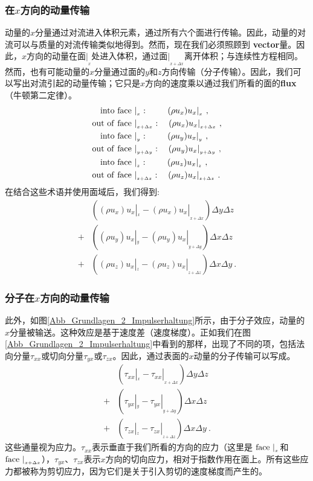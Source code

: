 \documentclass[MathematicsNumericsDerivationsAndOpenFOAM.tex]{subfiles}
\begin{document}
\subsubsection{在$x$方向的动量传输}
%
%
%
 动量的$x$分量通过对流进入体积元素，通过所有六个面进行传输。因此，动量的对流可以与质量的对流传输类似地得到。然而，现在我们必须照顾到 \textbf{vector}量。因此，$x$方向的动量在面$|_{_x}$处进入体积，通过面$|_{_{x+\Delta x}}$离开体积；与连续性方程相同。然而，也有可能动量的$x$分量通过面的$y$和$z$方向传输（分子传输）。因此，我们可以写出对流引起的动量传输；它只是$x$方向的速度乘以通过我们所看的面的\textbf{flux}（牛顿第二定律）。
%
%
\begin{align*}
 \mathrm{into~face~}&|_{_x}: ~~~~~~~
 (\rho u_x)u_x|_{_x} ~, \\
 \mathrm{out~of~face~}&|_{_{x+\Delta x}}: ~~~
 (\rho u_x)u_x |_{_{x+\Delta x}} ~,
 \\
 \mathrm{into~face~}&|_{_y} : ~~~~~~~
 (\rho u_y)u_x |_{_y} ~, \\
 \mathrm{out~of~face~}&|_{_{y+\Delta y}} : ~~~
 (\rho u_y)u_x |_{_{y+\Delta y}} ~,
 \\
 \mathrm{into~face~}&|_{_z} : ~~~~~~~
 (\rho u_z)u_x |_{_z} ~, \\
 \mathrm{out~of~face~}&|_{_{z+\Delta z}} : ~~~
 (\rho u_z)u_x |_{_{z+\Delta z}} ~.
\end{align*}
%
%
	在结合这些术语并使用面域后，我们得到:
%
%
\begin{align*}
  &\left(
    (\rho u_x)u_x |_{_x} - (\rho u_x)u_x |_{_{x+\Delta x}}
  \right)
  \Delta y \Delta z \\
  +&\left(
    (\rho u_y)u_x |_{_y} - (\rho u_y)u_x |_{_{y+\Delta y}}
  \right)
  \Delta x \Delta z  \\
  +&\left(
    (\rho u_z)u_x |_{_z} - (\rho u_z)u_x |_{_{z+\Delta z}}
  \right)
  \Delta x \Delta y ~.
\end{align*}
%
%
%
%
\subsubsection{分子在$x$方向的动量传输}
%
%
%
%
	此外，如图\ref{Abb_Grundlagen_2_Impulserhaltung}所示，由于分子效应，动量的$x$分量被输送。这种效应是基于速度差（速度梯度）。正如我们在图\ref{Abb_Grundlagen_2_Impulserhaltung}中看到的那样，出现了不同的项，包括法向分量$\tau_{xx}$或切向分量$\tau_{yx}$或$\tau_{zx}$。因此，通过表面的$x$动量的分子传输可以写成。
%
%
\begin{align*}
  &\left(
    \tau_{xx} |_{_x} - \tau_{xx} |_{_{x+\Delta x}}
  \right)
  \Delta y \Delta z \\
  +&\left(
    \tau_{yx} |_{_y} - \tau_{yx} |_{_{y+\Delta y}}
  \right)
  \Delta x \Delta z \\
  +&\left(
    \tau_{zx} |_{_z} - \tau_{zx} |_{_{z+\Delta z}}
  \right)
  \Delta x \Delta y ~.
\end{align*}
%
%
这些通量视为应力。$\tau_{xx}$表示垂直于我们所看的方向的应力（这里是 $\mathrm{face}~|_{_x}$和$\mathrm{face}~|_{_{x+\Delta x}}$），$\tau_{yx}$、$\tau_{zx}$表示$x$方向的切向应力，相对于指数作用在面上。所有这些应力都被称为剪切应力，因为它们是关于引入剪切的速度梯度而产生的。
%
%
%
%
\end{document}
